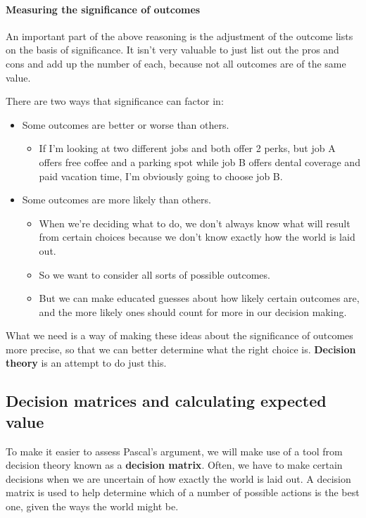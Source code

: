 \paragraph{Measuring the significance of outcomes} An important part of the above reasoning is the adjustment of the outcome lists on the basis of significance.  It isn't very valuable to just list out the pros and cons and add up the number of each, because not all outcomes are of the same value. 

There are two ways that significance can factor in:
\begin{itemize}
 \item Some outcomes are better or worse than others.  
  \begin{itemize}
    \item If I'm looking at two different jobs and both offer 2 perks, but job A offers free coffee and a parking spot while job B offers dental coverage and paid vacation time, I'm obviously going to choose job B.
  \end{itemize}
 \item Some outcomes are more likely than others.
  \begin{itemize}
   \item When we're deciding what to do, we don't always know what will result from certain choices because we don't know exactly how the world is laid out.
   \item So we want to consider all sorts of possible outcomes.
   \item But we can make educated guesses about how likely certain outcomes are, and the more likely ones should count for more in our decision making.
  \end{itemize}
\end{itemize}
What we need is a way of making these ideas about the significance of outcomes more precise, so that we can better determine what the right choice is.  \textbf{Decision theory} is an attempt to do just this.

\subsection{Decision matrices and calculating expected value}

To make it easier to assess Pascal's argument, we will make use of a tool from decision theory known as a \textbf{decision matrix}.  Often, we have to make certain decisions when we are uncertain of how exactly the world is laid out. A decision matrix is used to help determine which of a number of possible actions is the best one, given the ways the world might be.

